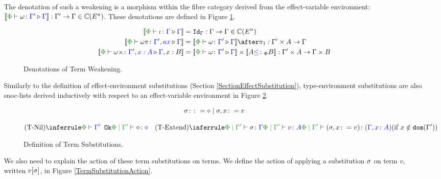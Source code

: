 The denotation of such a weakening is a morphism within the fibre category derived from the effect-variable environment: $\deno{\pewrel{\w}{\G'}{\G}}: \G' \rightarrow \G \in \C(E^n)$. These denotations are defined in Figure \ref{TermWeakeningDenotations}.

\begin{figure}[H]
    \centering
    \begin{framed}
        \begin{align}
            \deno{\pewrel{\i}{\G}{\G}} &= \idg: \G \rightarrow \G \in \C(E^n)
            \\
            \deno{\pewrel{\w\pi}{\G', ax}{\G}} &= \deno{\pewrel{\w}{\G'}{\G}}\after\p: \G'\times A \rightarrow \G
            \\
            \deno{\pewrel{\w\x}{\G', x: A}{\G, x: B}} &= \deno{\pewrel{\w}{\G'}{\G}}\times \deno{A\subtypep B}: \G'\times A \rightarrow \G\times B
        \end{align}
        
    \end{framed}\caption{Denotations of Term Weakening.}
    \label{TermWeakeningDenotations}
\end{figure}


Similarly to the definition of effect-environment substitutions (Section \ref{SectionEffectSubstitution}), type-environment substitutions are also snoc-lists derived inductively with respect to an effect-variable environment in Figure \ref{TermSubstitutionDefinition}.

\begin{figure}[H]
    \centering
\begin{framed}
    
    \[
        \sigma\colon\colon=\diamond\mid\sigma,x\colon= v    
    \]

    \[
    \ntreeruleI{\tsubnil}{\wellformedok{\P}{\G'}}{\etyperelation{\P}{\G'}{\nil}{\nil}}
    \quad
    \condtreeruleII{\tsubextend}{
        \etyperelation{\P}{\G'}{\si}{\G}
    }{
        \etyperelation{\P}{\G'}{v}{A}
    }{
        \etyperelation{\P}{\G'}{(\si, x \setto v)}{(\gax)}
    }{x \notin \dom{\G'}}
\]
\end{framed}
    \caption{Definition of Term Substitutions.}
    \label{TermSubstitutionDefinition}
\end{figure}




We also need to explain the action of these term substitutions on terms. We define the action of applying a substitution $\sigma$  on term $v$, written $v[\sigma]$, in Figure \ref{TermSubstitutionAction}. 


